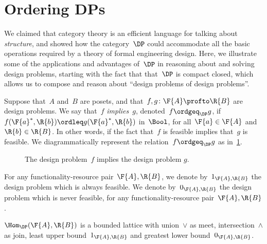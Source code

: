 

\section{Ordering DPs}
We claimed that category theory is an efficient language for talking about \emph{structure}, and showed how the category~$\DP$ could accommodate all the basic operations required by a theory of formal engineering design. Here, we illustrate some of the applications and advantages of~$\DP$ in reasoning about and solving design problems, starting with the fact that that~$\DP$ is compact closed, which allows us to compose and reason about ``design problems of design problems''.

\begin{definition}[Order on~$\DP$]
    \label{def:DP_loc_pos}

    Suppose that~$A$ and~$B$ are posets, and that~$f,g \colon \F{A} \profto \R{B}$ are design problems. We say that~$f$ \emph{implies}~$g$, denoted~$f \ordgeq_{\DP} g$, if~$f(\F{a}^*,\R{b}) \ordleq g(\F{a}^*,\R{b} )$ in~$\Bool$, for all~$\F{a} \in \F{A}$
    and~$\R{b} \in \R{B}$. In other words, if the fact that~$f$ is feasible implies that~$g$ is feasible. We diagrammatically represent the relation~$f \ordgeq_{\DP} g$ as in~\cref{fig:dpimplies}.
\end{definition}

\begin{figure}[h!]
    \begin{center}
    \end{center}
    \caption{The design problem~$f$ implies the design problem $g$. \label{fig:dpimplies}}
\end{figure}

\begin{remark}
    For any functionality-resource pair~$\F{A},\R{B}$, we denote by~$1_{\F{A},\R{B}}$ the design problem which is always feasible. We denote by~$0_{\F{A},\R{B}}$ the design problem which is never feasible, for any functionality-resource pair~$\F{A},\R{B}$.
\end{remark}
\begin{lemma}
    \label{lemma:dpboundedlattice}
    $\Hom_\DP(\F{A},\R{B})$ is a bounded lattice with union~$\vee$ as meet, intersection~$\wedge$ as join, least upper bound~$1_{\F{A},\R{B}}$ and greatest lower bound~$0_{\F{A},\R{B}}$.
\end{lemma}


